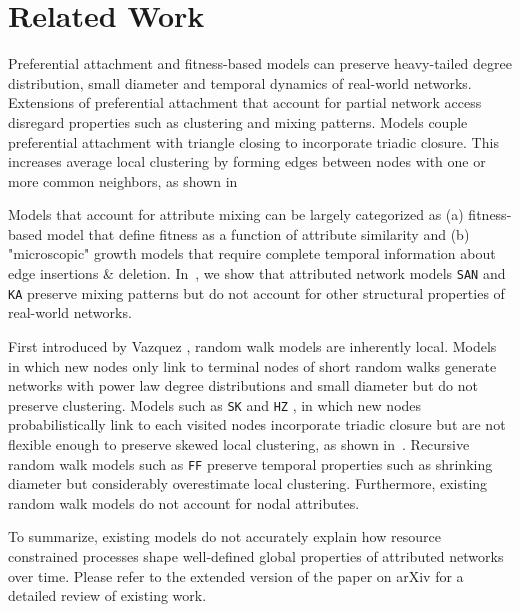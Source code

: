 
\section{Related Work}
\label{sec:Related Work}

Preferential attachment and fitness-based models \cite{bell2017network,medo2011temporal,bianconi2001bose,caldarelli2002scale}
can preserve heavy-tailed degree distribution, small diameter \cite{bollobas2004diameter} and temporal dynamics \cite{wang2013quantifying}
of real-world networks. Extensions of preferential attachment \cite{mossa2002truncation,zeng2005construction,wang2009local} that account for
partial network access disregard properties such as clustering and mixing patterns.
Models
\cite{holme2002growing,klemm2002highly,leskovec2008microscopic}
couple preferential attachment with triangle closing to incorporate triadic closure.
This increases {average} local clustering by forming edges between nodes
with one or more common neighbors, as shown in~


Models \cite{de2013scale,karimi2017visibility,gong2012evolution,zheleva2009co}
that account for attribute mixing can be largely categorized as (a) fitness-based model that define fitness as a function of
attribute similarity and (b) "microscopic" growth models  that require
complete temporal information about edge insertions \& deletion.
In~, we show that attributed network models
\texttt{SAN} and \texttt{KA} preserve mixing patterns but do not account for other
structural properties of real-world networks.

First introduced by Vazquez \cite{vazquez2000knowing}, random walk models are inherently local.
Models \cite{blum2006random} in which
new nodes only link to terminal nodes of short random walks generate
networks with power law degree distributions \cite{chebolu2008pagerank} and
small diameter \cite{mehrabian2016sa} but do not preserve clustering. Models
such as \texttt{SK} \cite{saramaki2004scale}
and \texttt{HZ} \cite{herrera2011generating}, in which new nodes probabilistically link to
each visited nodes incorporate triadic closure but are not flexible enough to preserve
{skewed} local clustering, as shown in~.
Recursive random walk models such as \texttt{FF} \cite{leskovec2005graphs}
preserve temporal properties such as shrinking diameter but considerably overestimate local clustering.
Furthermore, existing random walk models do not account for nodal attributes.

To summarize, existing models do not accurately explain how resource constrained processes
shape well-defined global properties of attributed networks over time.
Please refer to the
extended version of the paper on arXiv for a detailed review of existing work.
